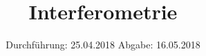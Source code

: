 

\subject{V64}
\title{Interferometrie}
\date{
  Durchführung: 25.04.2018
  \hspace{3em}
  Abgabe: 16.05.2018
}



\maketitle
\thispagestyle{empty}
\tableofcontents
\newpage
\setcounter{page}{1}





\printbibliography


